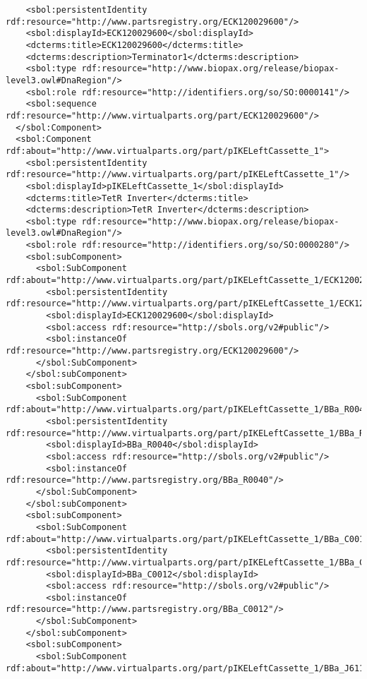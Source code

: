 \begin{lstlisting}
    <sbol:persistentIdentity rdf:resource="http://www.partsregistry.org/ECK120029600"/>
    <sbol:displayId>ECK120029600</sbol:displayId>
    <dcterms:title>ECK120029600</dcterms:title>
    <dcterms:description>Terminator1</dcterms:description>
    <sbol:type rdf:resource="http://www.biopax.org/release/biopax-level3.owl#DnaRegion"/>
    <sbol:role rdf:resource="http://identifiers.org/so/SO:0000141"/>
    <sbol:sequence rdf:resource="http://www.virtualparts.org/part/ECK120029600"/>
  </sbol:Component>
  <sbol:Component rdf:about="http://www.virtualparts.org/part/pIKELeftCassette_1">
    <sbol:persistentIdentity rdf:resource="http://www.virtualparts.org/part/pIKELeftCassette_1"/>
    <sbol:displayId>pIKELeftCassette_1</sbol:displayId>
    <dcterms:title>TetR Inverter</dcterms:title>
    <dcterms:description>TetR Inverter</dcterms:description>
    <sbol:type rdf:resource="http://www.biopax.org/release/biopax-level3.owl#DnaRegion"/>
    <sbol:role rdf:resource="http://identifiers.org/so/SO:0000280"/>
    <sbol:subComponent>
      <sbol:SubComponent rdf:about="http://www.virtualparts.org/part/pIKELeftCassette_1/ECK120029600">
        <sbol:persistentIdentity rdf:resource="http://www.virtualparts.org/part/pIKELeftCassette_1/ECK120029600"/>
        <sbol:displayId>ECK120029600</sbol:displayId>
        <sbol:access rdf:resource="http://sbols.org/v2#public"/>
        <sbol:instanceOf rdf:resource="http://www.partsregistry.org/ECK120029600"/>
      </sbol:SubComponent>
    </sbol:subComponent>
    <sbol:subComponent>
      <sbol:SubComponent rdf:about="http://www.virtualparts.org/part/pIKELeftCassette_1/BBa_R0040">
        <sbol:persistentIdentity rdf:resource="http://www.virtualparts.org/part/pIKELeftCassette_1/BBa_R0040"/>
        <sbol:displayId>BBa_R0040</sbol:displayId>
        <sbol:access rdf:resource="http://sbols.org/v2#public"/>
        <sbol:instanceOf rdf:resource="http://www.partsregistry.org/BBa_R0040"/>
      </sbol:SubComponent>
    </sbol:subComponent>
    <sbol:subComponent>
      <sbol:SubComponent rdf:about="http://www.virtualparts.org/part/pIKELeftCassette_1/BBa_C0012">
        <sbol:persistentIdentity rdf:resource="http://www.virtualparts.org/part/pIKELeftCassette_1/BBa_C0012"/>
        <sbol:displayId>BBa_C0012</sbol:displayId>
        <sbol:access rdf:resource="http://sbols.org/v2#public"/>
        <sbol:instanceOf rdf:resource="http://www.partsregistry.org/BBa_C0012"/>
      </sbol:SubComponent>
    </sbol:subComponent>
    <sbol:subComponent>
      <sbol:SubComponent rdf:about="http://www.virtualparts.org/part/pIKELeftCassette_1/BBa_J61101">

\end{lstlisting}

